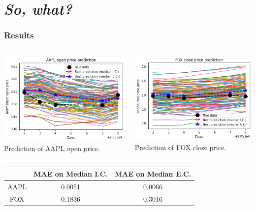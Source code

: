 \documentclass{beamer}
\begin{document}
\section{\textit{So, what?}}{
\begin{frame}
	\frametitle{Results}
	\begin{columns}
	\begin{column}{.5\textwidth}
	\centering
	\includegraphics[height=0.45\textheight]{open_AAPL.png}
	Prediction of AAPL open price.
	\end{column}%

	\begin{column}{.5\textwidth}
	\centering
	\includegraphics[height=0.45\textheight]{close_FOX.png}
	Prediction of FOX close price.
	\end{column}
	\end{columns}

	\hfill \break

	\centering
	\begin{tabular}{|c|c|c|} \hline
	& MAE on Median I.C. & MAE on Median E.C. \\
	\hline
	AAPL & 0.0051 & 0.0066 \\
	\hline
	FOX & 0.1836 & 0.3016 \\
	\hline
 	\end{tabular}


\end{frame}}
\end{document}
